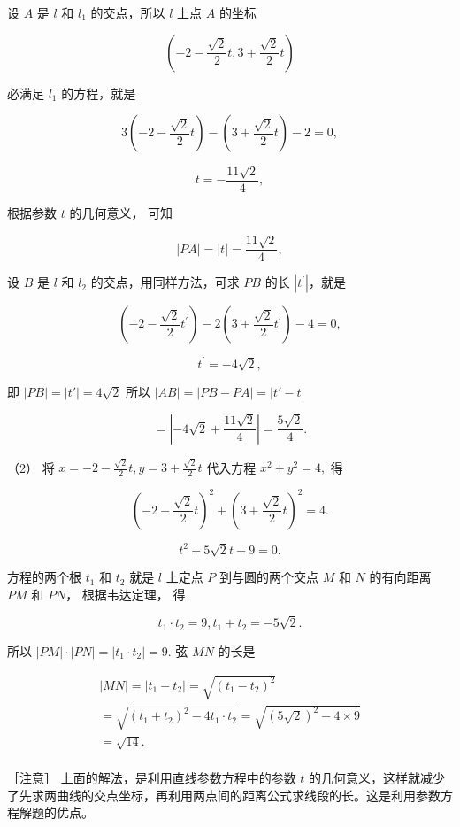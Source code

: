 设 \(A\) 是 \(l\) 和 \(l_{1}\) 的交点，所以 \(l\) 上点 \(A\) 的坐标

\[
\left(- 2 - \frac {\sqrt {2}}{2} t, 3 + \frac {\sqrt {2}}{2} t\right)
\]

必满足 \(l_{1}\) 的方程，就是

\[
3 \left(- 2 - \frac {\sqrt {2}}{2} t\right) - \left(3 + \frac {\sqrt {2}}{2} t\right) - 2 = 0,
\]

\[
t = - \frac {11 \sqrt {2}}{4},
\]

根据参数 \(t\) 的几何意义， 可知

\[
\left| PA \right| = \left| t \right| = \frac {11 \sqrt {2}}{4},
\]

设 \(B\) 是 \(l\) 和 \(l_{2}\) 的交点，用同样方法，可求 \(PB\) 的长
\(|t^{\prime}|\)，就是

\[
\left(- 2 - \frac {\sqrt {2}}{2} t^{\prime}\right) - 2 \left(3 + \frac {\sqrt {2}}{2} t^{\prime}\right) - 4 = 0,
\]

\[
t^{\prime} = - 4 \sqrt {2},
\]

即 \(|PB| = |t'| = 4\sqrt{2}\) 所以 \(|AB| = |PB - PA| = |t' - t|\)

\[
= \left| - 4 \sqrt {2} + \frac {11 \sqrt {2}}{4} \right| = \frac {5 \sqrt {2}}{4}.
\]

（2） 将 \(x = -2 - \frac{\sqrt{2}}{2} t, y = 3 + \frac{\sqrt{2}}{2} t\)
代入方程 \(x^2 + y^2 = 4,\) 得

\[
\left(- 2 - \frac {\sqrt {2}}{2} t\right) ^ {2} + \left(3 + \frac {\sqrt {2}}{2} t\right) ^ {2} = 4.
\]

\[
t^{2} + 5 \sqrt {2} t + 9 = 0.
\]

方程的两个根 \(t_1\) 和 \(t_2\) 就是 \(l\) 上定点 \(P\) 到与圆的两个交点
\(M\) 和 \(N\) 的有向距离 \(PM\) 和 \(PN\)， 根据韦达定理， 得

\[
t_{1} \cdot t_{2} = 9, t_{1} + t_{2} = - 5 \sqrt {2}.
\]

所以 \(|PM|\cdot |PN| = |t_1\cdot t_2| = 9.\) 弦 \(MN\) 的长是

\[
\begin{array}{l} \vert MN \vert = \vert t_{1} - t_{2} \vert = \sqrt {(t_{1} - t_{2}) ^ {2}} \\ = \sqrt {\left(t_{1} + t_{2}\right) ^ {2} - 4 t_{1} \cdot t_{2}} = \sqrt {(5 \sqrt {2}) ^ {2} - 4 \times 9} \\ = \sqrt {14}. \\ \end{array}
\]

［注意］ 上面的解法，是利用直线参数方程中的参数 \(t\)
的几何意义，这样就减少了先求两曲线的交点坐标，再利用两点间的距离公式求线段的长。这是利用参数方程解题的优点。


